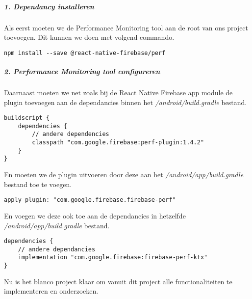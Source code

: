 \subparagraph{1. Dependancy installeren}
Als eerst moeten we de Performance Monitoring tool aan de root van ons project toevoegen. 
Dit kunnen we doen met volgend commando.
\begin{verbatim}
npm install --save @react-native-firebase/perf
\end{verbatim}

\subparagraph{2. Performance Monitoring tool configureren}
Daarnaast moeten we net zoals bij de React Native Firebase app module de plugin toevoegen aan 
de dependancies binnen het \textit{/android/build.gradle} bestand. 
\begin{verbatim}
buildscript {
    dependencies {
        // andere dependencies
        classpath "com.google.firebase:perf-plugin:1.4.2"
    }
}
\end{verbatim}
En moeten we de plugin uitvoeren door deze aan het \textit{/android/app/build.gradle} bestand toe te voegen.
\begin{verbatim}
apply plugin: "com.google.firebase.firebase-perf"
\end{verbatim}
En voegen we deze ook toe aan de dependancies in hetzelfde \textit{/android/app/build.gradle} bestand.
\begin{verbatim}
dependencies {
    // andere dependancies
    implementation "com.google.firebase:firebase-perf-ktx"
}
\end{verbatim}
Nu is het blanco project klaar om vanuit dit project alle functionaliteiten te 
implementeren en onderzoeken.